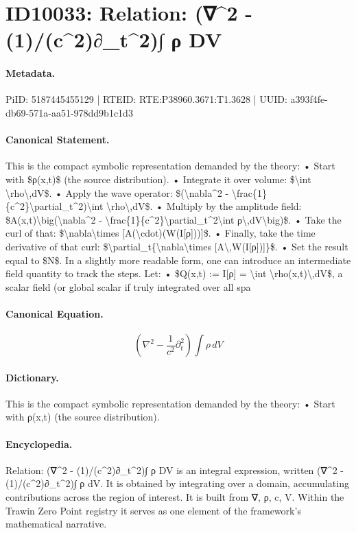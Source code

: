 \section*{ID10033: Relation: (∇\textasciicircum{}2 - (1)/(c\textasciicircum{}2)∂\_t\textasciicircum{}2)∫ ρ DV}
\paragraph{Metadata.}
PiID: 5187445455129 | RTEID: RTE:P38960.3671:T1.3628 | UUID: a393f4fe-db69-571a-aa51-978dd9b1c1d3

\paragraph{Canonical Statement.}
This is the compact symbolic representation demanded by the theory: • Start with \$ρ(x,t)\$ (the source distribution). • Integrate it over volume: \$\textbackslash{}int \textbackslash{}rho\textbackslash{},dV\$. • Apply the wave operator: \$(\textbackslash{}nabla\textasciicircum{}2 - \textbackslash{}frac\{1\}\{c\textasciicircum{}2\}\textbackslash{}partial\_t\textasciicircum{}2)\textbackslash{}int \textbackslash{}rho\textbackslash{},dV\$. • Multiply by the amplitude field: \$A(x,t)\textbackslash{}big(\textbackslash{}nabla\textasciicircum{}2 - \textbackslash{}frac\{1\}\{c\textasciicircum{}2\}\textbackslash{}partial\_t\textasciicircum{}2\textbackslash{}int ρ\textbackslash{},dV\textbackslash{}big)\$. • Take the curl of that: \$\textbackslash{}nabla\textbackslash{}times [A(\textbackslash{}cdot)(W(I[ρ]))]\$. • Finally, take the time derivative of that curl: \$\textbackslash{}partial\_t\{\textbackslash{}nabla\textbackslash{}times [A\textbackslash{},W(I[ρ])]\}\$. • Set the result equal to \$N\$. In a slightly more readable form, one can introduce an intermediate field quantity to track the steps. Let: • \$Q(x,t) := I[ρ] = \textbackslash{}int \textbackslash{}rho(x,t)\textbackslash{},dV\$, a scalar field (or global scalar if truly integrated over all spa

\paragraph{Canonical Equation.}
\[
(\nabla^2 - \frac{1}{c^2}\partial_t^2)\int \rho\,dV
\]

\paragraph{Dictionary.}
This is the compact symbolic representation demanded by the theory: • Start with ρ(x,t) (the source distribution).

\paragraph{Encyclopedia.}
Relation: (∇\textasciicircum{}2 - (1)/(c\textasciicircum{}2)∂\_t\textasciicircum{}2)∫ ρ DV is an integral expression, written (∇\textasciicircum{}2 - (1)/(c\textasciicircum{}2)∂\_t\textasciicircum{}2)∫ ρ dV. It is obtained by integrating over a domain, accumulating contributions across the region of interest. It is built from ∇, ρ, c, V. Within the Trawin Zero Point registry it serves as one element of the framework's mathematical narrative.
